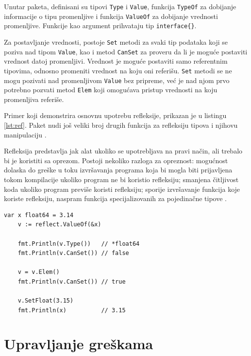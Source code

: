 \documentclass[12pt,oneside]{memoir}
\begin{document}
Unutar paketa, definisani su tipovi \texttt{Type} i \texttt{Value}, funkcija \texttt{TypeOf} za dobijanje informacije o tipu promenljive i funkcija \texttt{ValueOf} za dobijanje vrednosti promenljive. Funkcije kao argument prihvataju tip \texttt{interface\{\}}. 

Za postavljanje vrednosti, postoje \texttt{Set} metodi za svaki tip podataka koji se poziva nad tipom \texttt{Value}, kao i metod \texttt{CanSet} za proveru da li je moguće postaviti vrednost datoj promenljivi. Vrednost je moguće postaviti samo referentnim tipovima, odnosno promeniti vrednost na koju oni referišu. \texttt{Set} metodi se ne mogu pozivati nad promenljivom \texttt{Value} bez pripreme, već je nad njom prvo potrebno pozvati metod \texttt{Elem} koji omogućava pristup vrednosti na koju promenljiva referiše.  

Primer koji demonstrira osnovnu upotrebu refleksije, prikazan je u listingu \ref{lst:ref}. Paket nudi još veliki broj drugih funkcija za refleksiju tipova i njihovu manipulaciju \cite{reflect}.

Refleksija predstavlja jak alat ukoliko se upotrebljava na pravi način, ali trebalo bi je koristiti sa oprezom. Postoji nekoliko razloga za opreznost: mogućnost dolaska do greške u toku izvršavanja programa koja bi mogla biti prijavljena tokom kompilacije ukoliko program ne bi koristio refleksiju; smanjena čitljivost koda ukoliko program previše koristi refleksiju; sporije izvršavanje funkcija koje koriste refleksiju, naspram funkcija specijalizovanih za pojedinačne tipove \cite{bookGoProg}.

 \begin{center}
\begin{lstlisting}[caption=Primer koji demonstrira osnovnu upotrebu refleksije, label={lst:ref},  backgroundcolor=\color{background}]
	var x float64 = 3.14
	v := reflect.ValueOf(&x) 
	
	fmt.Println(v.Type())	// *float64
	fmt.Println(v.CanSet())	// false
	
	v = v.Elem()
	fmt.Println(v.CanSet())	// true
	
	v.SetFloat(3.15)
	fmt.Println(x)			// 3.15
\end{lstlisting}
\end{center}

\section{Upravljanje greškama} \label{error}
\end{document}
